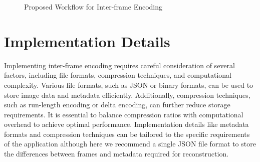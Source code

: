 \documentclass[twocolumn]{article}
\begin{document}
\begin{figure}[H]
    \centering
    \caption{Proposed Workflow for Inter-frame Encoding}
    \label{fig:figure4}
\end{figure}


\section{Implementation Details}
Implementing inter-frame encoding requires careful consideration of several factors, including file formats, compression techniques, and computational complexity. Various file formats, such as JSON or binary formats, can be used to store image data and metadata efficiently. Additionally, compression techniques, such as run-length encoding or delta encoding, can further reduce storage requirements. It is essential to balance compression ratios with computational overhead to achieve optimal performance. Implementation details like metadata formats and compression techniques can be tailored to the specific requirements of the application although here we recommend a single JSON file format to store the differences between frames and metadata required for reconstruction.

\end{document}
